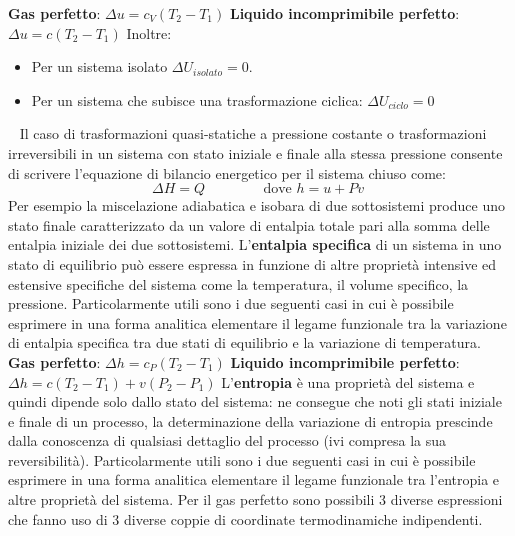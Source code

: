 \textbf{Gas perfetto}: $\Delta u = c_V (T_2 - T_1)$\newline
\textbf{Liquido incomprimibile perfetto}: $\Delta u = c(T_2-T_1)$\newline
Inoltre:
\begin{itemize}
    \item Per un sistema isolato $\Delta U_{isolato} = 0$.
    \item Per un sistema che subisce una trasformazione ciclica: $\Delta U_{ciclo} = 0$
\end{itemize}
\ \newline
\newline
Il caso di trasformazioni quasi-statiche a pressione costante o trasformazioni irreversibili in un sistema con stato iniziale e finale alla stessa pressione consente di scrivere l’equazione di bilancio energetico per il sistema chiuso come:
\[
    \Delta H = Q \;\;\;\;\;\;\;\;\;\;\;\;\;\;\;\text{dove $h = u + Pv$}\;
\]
Per esempio la miscelazione adiabatica e isobara di due sottosistemi produce uno stato finale caratterizzato da un valore di entalpia totale pari alla somma delle entalpia iniziale dei due sottosistemi. \newline
L'\textbf{entalpia specifica} di un sistema in uno stato di equilibrio può essere espressa
in funzione di altre proprietà intensive ed estensive specifiche del sistema come la
temperatura, il volume specifico, la pressione. Particolarmente utili sono i due seguenti casi
in cui è possibile esprimere in una forma analitica elementare il legame funzionale tra la
variazione di entalpia specifica tra due stati di equilibrio e la variazione di temperatura. \newline
\textbf{Gas perfetto}: $\Delta h = c_P (T_2 - T_1)$\newline
\textbf{Liquido incomprimibile perfetto}: $\Delta h = c(T_2-T_1) + v(P_2-P_1)$\newline
\newline
L'\textbf{entropia} è una proprietà del sistema e quindi dipende solo dallo stato del sistema: ne consegue che noti gli stati iniziale e finale di un processo, la determinazione della variazione di entropia prescinde dalla conoscenza di qualsiasi dettaglio del processo (ivi compresa la sua reversibilità). Particolarmente utili sono i due seguenti casi in cui è possibile esprimere in una forma analitica elementare il legame funzionale tra l'entropia e altre proprietà del sistema. Per il gas perfetto sono possibili 3 diverse espressioni che fanno uso di 3 diverse coppie di coordinate termodinamiche indipendenti. \newline
